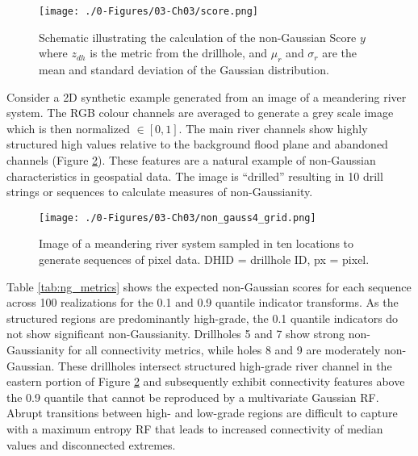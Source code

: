 \begin{figure}[htb!]
    \centering
    \texttt{[image: ./0-Figures/03-Ch03/score.png]}
    \caption{Schematic illustrating the calculation of the non-Gaussian Score $y$ where $z_{dh}$ is the metric from the drillhole, and $\mu_{r}$ and $\sigma_{r}$ are the mean and standard deviation of the Gaussian distribution.}
    \label{fig:score}
\end{figure}

Consider a \gls{2D} synthetic example generated from an image of a meandering river system. The RGB colour channels are averaged to generate a grey scale image which is then normalized $\in [0,1]$. The main river channels show highly structured high values relative to the background flood plane and abandoned channels (Figure \ref{fig:non_gauss4_grid}). These features are a natural example of non-Gaussian characteristics in geospatial data. The image is ``drilled'' resulting in 10 drill strings or sequences to calculate measures of non-Gaussianity.

\begin{figure}[htb!]
    \centering
    \texttt{[image: ./0-Figures/03-Ch03/non\_gauss4\_grid.png]}
    \caption{Image of a meandering river system sampled in ten locations to generate sequences of pixel data. DHID = drillhole ID, px = pixel. }
    \label{fig:non_gauss4_grid}
\end{figure}

Table \ref{tab:ng_metrics} shows the expected non-Gaussian scores for each sequence across 100 realizations for the 0.1 and 0.9 quantile indicator transforms. As the structured regions are predominantly high-grade, the 0.1 quantile indicators do not show significant non-Gaussianity. Drillholes 5 and 7 show strong non-Gaussianity for all connectivity metrics, while holes 8 and 9 are moderately non-Gaussian. These drillholes intersect structured high-grade river channel in the eastern portion of Figure \ref{fig:non_gauss4_grid} and subsequently exhibit connectivity features above the 0.9 quantile that cannot be reproduced by a multivariate Gaussian \gls{RF}. Abrupt transitions between high- and low-grade regions are difficult to capture with a maximum entropy \gls{RF} that leads to increased connectivity of median values and disconnected extremes.

\begin{table}[!htb]
    \centering
    \caption{Non-Gaussian metrics calculated for 10 drillholes considering the 0.1 and 0.9 quantile indicator transforms. $y$-scores $\geq 2.5$ are considered strongly non-Gaussian. DHID corresponds to Figure \ref{fig:non_gauss4_grid}.}
    \resizebox{1\width}{!}{}
    \label{tab:ng_metrics}
\end{table}

